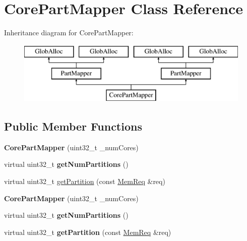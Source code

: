 \hypertarget{classCorePartMapper}{\section{Core\-Part\-Mapper Class Reference}
\label{classCorePartMapper}
}
Inheritance diagram for Core\-Part\-Mapper\-:\begin{figure}[H]
\begin{center}
\leavevmode
\includegraphics[height=3.000000cm]{classCorePartMapper}
\end{center}
\end{figure}
\subsection*{Public Member Functions}
\begin{DoxyCompactItemize}
\item 
\hypertarget{classCorePartMapper_ab235c7372cb858fa493ea760fa46c3a1}{{\bfseries Core\-Part\-Mapper} (uint32\-\_\-t \-\_\-num\-Cores)}\label{classCorePartMapper_ab235c7372cb858fa493ea760fa46c3a1}

\item 
\hypertarget{classCorePartMapper_a687d08f86d047782501b81fbc366fd50}{virtual uint32\-\_\-t {\bfseries get\-Num\-Partitions} ()}\label{classCorePartMapper_a687d08f86d047782501b81fbc366fd50}

\item 
virtual uint32\-\_\-t \hyperlink{classCorePartMapper_a37c35ce6508de5e769dd138f47d8c760}{get\-Partition} (const \hyperlink{structMemReq}{Mem\-Req} \&req)
\item 
\hypertarget{classCorePartMapper_ab235c7372cb858fa493ea760fa46c3a1}{{\bfseries Core\-Part\-Mapper} (uint32\-\_\-t \-\_\-num\-Cores)}\label{classCorePartMapper_ab235c7372cb858fa493ea760fa46c3a1}

\item 
\hypertarget{classCorePartMapper_a687d08f86d047782501b81fbc366fd50}{virtual uint32\-\_\-t {\bfseries get\-Num\-Partitions} ()}\label{classCorePartMapper_a687d08f86d047782501b81fbc366fd50}

\item 
\hypertarget{classCorePartMapper_a274f1616c767b9dba97a0c649cebf9a4}{virtual uint32\-\_\-t {\bfseries get\-Partition} (const \hyperlink{structMemReq}{Mem\-Req} \&req)}\label{classCorePartMapper_a274f1616c767b9dba97a0c649cebf9a4}

\end{DoxyCompactItemize}


